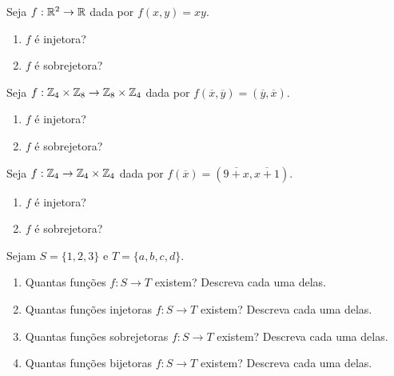 \documentclass[12pt]{exam}
\begin{document}
\vspace{.6cm}

\questao{} Seja $f: \mathbb{R}^2 \to \mathbb{R}$ dada por $f(x,y) = xy$.
\begin{enumerate}[label={\alph*})]
    \item $f$ é injetora?

    \item $f$ é sobrejetora?
\end{enumerate}

\vspace{.3cm}

\questao{} Seja $f: \mathbb{Z}_4 \times \mathbb{Z}_8 \to \mathbb{Z}_8 \times \mathbb{Z}_4$ dada por $f(\overline{x},\overline{y}) = (\overline{y}, \overline{x})$.
\begin{enumerate}[label={\alph*})]
    \item $f$ é injetora?

    \item $f$ é sobrejetora?
\end{enumerate}

\vspace{.3cm}

\questao{} Seja $f: \mathbb{Z}_4 \to \mathbb{Z}_4 \times \mathbb{Z}_4$ dada por $f(\overline{x}) = (\overline{9 + x},\overline{x+1})$.
\begin{enumerate}[label={\alph*})]
    \item $f$ é injetora?

    \item $f$ é sobrejetora?
\end{enumerate}

\vspace{.3cm}

\questao{} Sejam $S = \{1, 2, 3\}$ e $T = \{a, b, c, d\}$.
\begin{enumerate}[label={\alph*})]
    \item Quantas funções $f : S \to T$ existem? Descreva cada uma delas.

    \item Quantas funções injetoras $f : S \to T$ existem? Descreva cada uma delas.

    \item Quantas funções sobrejetoras $f : S \to T$ existem? Descreva cada uma delas.

    \item Quantas funções bijetoras $f : S \to T$ existem? Descreva cada uma delas.
\end{enumerate}

\vspace{.3cm}
\end{document}
